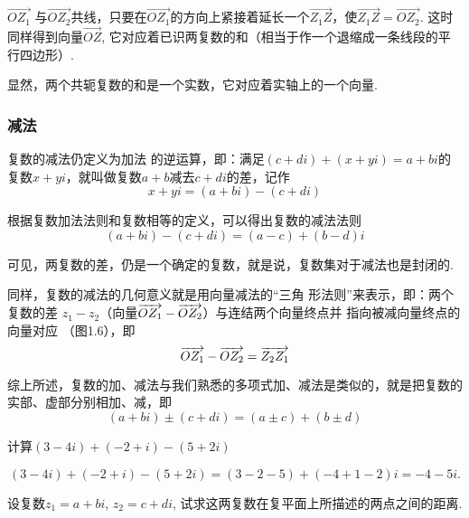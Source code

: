 $\overrightarrow{OZ_{1}}$ 与$\overrightarrow{OZ_{2}}$共线，只要在$\overrightarrow{OZ_{1}}$的方向上紧接着延长一个$\overrightarrow{Z_{1}Z}$，使$\overrightarrow{Z_{1}Z}=\overrightarrow{OZ_{2}}$. 这时同样得到向量$\overrightarrow{OZ}$, 它对应着已识两复数的和（相当于作一个退缩成一条线段的平行四边形）.

显然，两个共轭复数的和是一个实数，它对应着实轴上的一个向量. 

\subsubsection{减法}
复数的减法仍定义为加法
的逆运算，即：满足$(c+di)+(x+yi)=a+bi$的复数$x+yi$，就叫做复数$a+b$减去$c+di$的差，记作
\[x+yi=(a+bi)-(c+di)\]

根据复数加法法则和复数相等的定义，可以得出复数的减法法则
\[(a+bi)-(c+di)=(a-c)+(b-d)i\]

可见，两复数的差，仍是一个确定的复数，就是说，复数集对于减法也是封闭的.

同样，复数的减法的几何意义就是用向量减法的“三角
形法则”来表示，即：两个复数的差
$z_1-z_2$（向量$\overrightarrow{OZ_1}-\overrightarrow{OZ_2}$）与连结两个向量终点并
指向被减向量终点的向量对应
（图1.6），即
\[\overrightarrow{OZ_1}-\overrightarrow{OZ_2}=\overrightarrow{Z_2Z_1}\]

\begin{figure}[htp]
    \centering
{}
    \caption{}
\end{figure}

综上所述，复数的加、减法与我们熟悉的多项式加、减法是类似的，就是把复数的实部、虚部分别相加、减，即
\[(a+bi)\pm (c+di)=(a\pm c)+(b\pm d)\]

\begin{example}
    计算$(3-4i)+(-2+i)-(5+2i)$
\end{example}

\begin{solution}
 $$(3-4i)+(-2+i)-(5+2i)
=(3-2-5)+(-4+1-2)i=-4-5i.$$   
\end{solution}

\begin{example}
    设复数$z_1=a+bi$, $z_2=c+di$, 试求这两复数在复平面上所描述的两点之间的距离.
\end{example}

